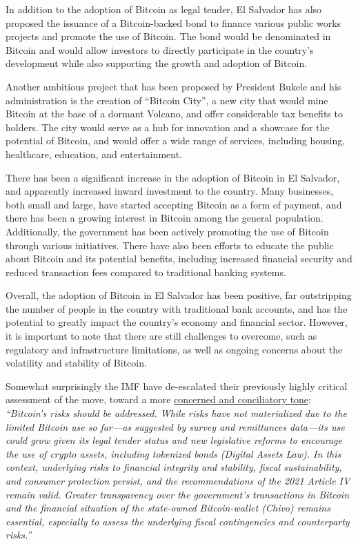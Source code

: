 In addition to the adoption of Bitcoin as legal tender, El Salvador has also proposed the issuance of a Bitcoin-backed bond to finance various public works projects and promote the use of Bitcoin. The bond would be denominated in Bitcoin and would allow investors to directly participate in the country's development while also supporting the growth and adoption of Bitcoin.\par
Another ambitious project that has been proposed by President Bukele and his administration is the creation of ``Bitcoin City'', a new city that would mine Bitcoin at the base of a dormant Volcano, and offer considerable tax benefits to holders. The city would serve as a hub for innovation and a showcase for the potential of Bitcoin, and would offer a wide range of services, including housing, healthcare, education, and entertainment.\par
There has been a significant increase in the adoption of Bitcoin in El Salvador, and apparently increased inward investment to the country. Many businesses, both small and large, have started accepting Bitcoin as a form of payment, and there has been a growing interest in Bitcoin among the general population. Additionally, the government has been actively promoting the use of Bitcoin through various initiatives. There have also been efforts to educate the public about Bitcoin and its potential benefits, including increased financial security and reduced transaction fees compared to traditional banking systems.\par
Overall, the adoption of Bitcoin in El Salvador has been positive, far outstripping the number of people in the country with traditional bank accounts, and has the potential to greatly impact the country's economy and financial sector. However, it is important to note that there are still challenges to overcome, such as regulatory and infrastructure limitations, as well as ongoing concerns about the volatility and stability of Bitcoin.\par 
Somewhat surprisingly the IMF have de-escalated their previously highly critical assessment of the move, toward a more \href{https://www.imf.org/en/News/Articles/2023/02/10/el-salvador-staff-concluding-statement-of-the-2023-article-iv-mission}{concerned and conciliatory tone}:
\textit{``Bitcoin’s risks should be addressed. While risks have not materialized due to the limited Bitcoin use so far—as suggested by survey and remittances data—its use could grow given its legal tender status and new legislative reforms to encourage the use of crypto assets, including tokenized bonds (Digital Assets Law). In this context, underlying risks to financial integrity and stability, fiscal sustainability, and consumer protection persist, and the recommendations of the 2021 Article IV remain valid. Greater transparency over the government's transactions in Bitcoin and the financial situation of the state-owned Bitcoin-wallet (Chivo) remains essential, especially to assess the underlying fiscal contingencies and counterparty risks.''}\par
